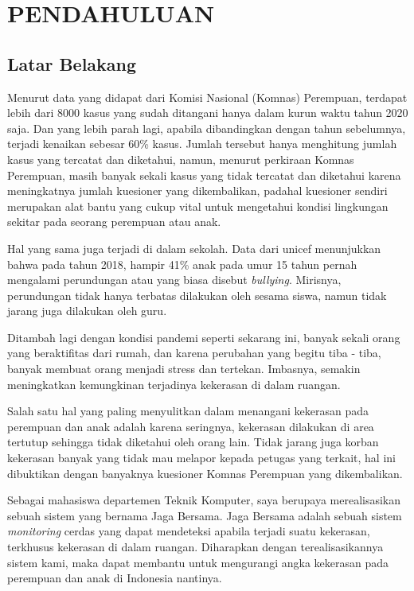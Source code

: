 \chapter{PENDAHULUAN}


\section{Latar Belakang}

Menurut data yang didapat dari Komisi Nasional (Komnas) Perempuan, terdapat lebih dari 8000 kasus yang sudah ditangani hanya dalam kurun waktu tahun 2020 saja. Dan yang lebih parah lagi, apabila dibandingkan dengan tahun sebelumnya, terjadi kenaikan sebesar 60\%  kasus. Jumlah tersebut hanya menghitung jumlah kasus yang tercatat dan diketahui, namun, menurut perkiraan Komnas Perempuan, masih banyak sekali kasus yang tidak tercatat dan diketahui karena meningkatnya jumlah kuesioner yang dikembalikan, padahal kuesioner sendiri merupakan alat bantu yang cukup vital untuk mengetahui kondisi lingkungan sekitar pada seorang perempuan atau anak.

Hal yang sama juga terjadi di dalam sekolah. Data dari unicef menunjukkan bahwa pada tahun 2018, hampir 41\% anak pada umur 15 tahun pernah mengalami perundungan atau yang biasa disebut \textit{bullying}. Mirisnya, perundungan tidak hanya terbatas dilakukan oleh sesama siswa, namun tidak jarang juga dilakukan oleh guru.

Ditambah lagi dengan kondisi pandemi seperti sekarang ini, banyak sekali orang yang beraktifitas dari rumah, dan karena perubahan yang begitu tiba - tiba, banyak membuat orang menjadi stress dan tertekan. Imbasnya, semakin meningkatkan kemungkinan terjadinya kekerasan di dalam ruangan.

Salah satu hal yang paling menyulitkan dalam menangani kekerasan pada perempuan dan anak adalah karena seringnya, kekerasan dilakukan di area tertutup sehingga tidak diketahui oleh orang lain. Tidak jarang juga korban kekerasan banyak yang tidak mau melapor kepada petugas yang terkait, hal ini dibuktikan dengan banyaknya kuesioner Komnas Perempuan yang dikembalikan.

Sebagai mahasiswa departemen Teknik Komputer, saya berupaya merealisasikan sebuah sistem yang bernama Jaga Bersama. Jaga Bersama adalah sebuah sistem \textit{monitoring} cerdas yang dapat mendeteksi apabila terjadi suatu kekerasan, terkhusus kekerasan di dalam ruangan. Diharapkan dengan terealisasikannya sistem kami, maka dapat membantu untuk mengurangi angka kekerasan pada perempuan dan anak di Indonesia nantinya.


